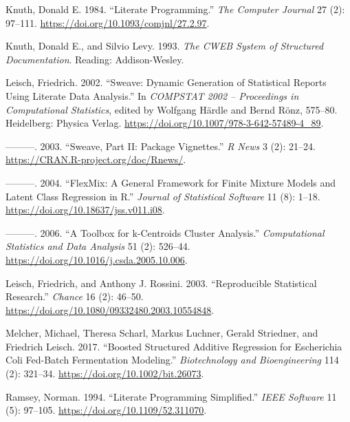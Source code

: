 \begin{CSLReferences}{1}{0}
\leavevmode{}%
Knuth, Donald E. 1984. {``Literate Programming.''} \emph{The Computer Journal} 27 (2): 97--111. \url{https://doi.org/10.1093/comjnl/27.2.97}.

\leavevmode{}%
Knuth, Donald E., and Silvio Levy. 1993. \emph{The {CWEB} System of Structured Documentation}. Reading: Addison-Wesley.

\leavevmode{}%
Leisch, Friedrich. 2002. {``{S}weave: {D}ynamic Generation of Statistical Reports Using Literate Data Analysis.''} In \emph{COMPSTAT 2002 -- Proceedings in Computational Statistics}, edited by Wolfgang Härdle and Bernd Rönz, 575--80. Heidelberg: Physica Verlag. \url{https://doi.org/10.1007/978-3-642-57489-4_89}.

\leavevmode{}%
---------. 2003. {``{S}weave, Part {II}: {P}ackage Vignettes.''} \emph{{R} News} 3 (2): 21--24. \url{https://CRAN.R-project.org/doc/Rnews/}.

\leavevmode{}%
---------. 2004. {``{FlexMix}: A General Framework for Finite Mixture Models and Latent Class Regression in {R}.''} \emph{Journal of Statistical Software} 11 (8): 1--18. \url{https://doi.org/10.18637/jss.v011.i08}.

\leavevmode{}%
---------. 2006. {``A Toolbox for k-Centroids Cluster Analysis.''} \emph{Computational Statistics and Data Analysis} 51 (2): 526--44. \url{https://doi.org/10.1016/j.csda.2005.10.006}.

\leavevmode{}%
Leisch, Friedrich, and Anthony J. Rossini. 2003. {``Reproducible Statistical Research.''} \emph{Chance} 16 (2): 46--50. \url{https://doi.org/10.1080/09332480.2003.10554848}.

\leavevmode{}%
Melcher, Michael, Theresa Scharl, Markus Luchner, Gerald Striedner, and Friedrich Leisch. 2017. {``Boosted Structured Additive Regression for {E}scherichia Coli Fed-Batch Fermentation Modeling.''} \emph{Biotechnology and Bioengineering} 114 (2): 321--34. \url{https://doi.org/10.1002/bit.26073}.

\leavevmode{}%
Ramsey, Norman. 1994. {``Literate Programming Simplified.''} \emph{IEEE Software} 11 (5): 97--105. \url{https://doi.org/10.1109/52.311070}.


\end{CSLReferences}
